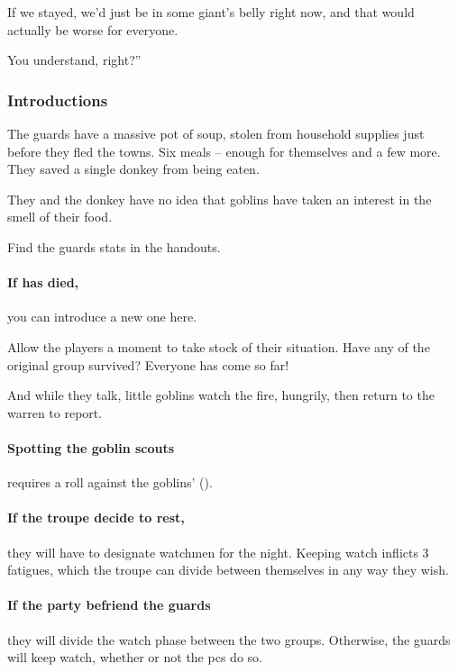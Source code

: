\begin{multicols}{2}
\begin{speechtext}
  If we stayed, we'd just be in some giant's belly right now, and that would actually be worse for everyone.

  You understand, right?''
\end{speechtext}

\subsubsection{Introductions}

The \glspl{guard} have a massive pot of soup, stolen from household supplies just before they fled the towns.
Six meals -- enough for themselves and a few more.
They saved a single donkey from being eaten.


They and the donkey have no idea that goblins have taken an interest in the smell of their food.

Find the \glspl{guard} stats in the handouts.

\paragraph{If  has died,}
you can introduce a new one here.

Allow the players a moment to take stock of their situation.
Have any of the original group survived?
Everyone has come so far!

And while they talk, little goblins watch the fire, hungrily, then return to the warren to report.


\paragraph{Spotting the goblin scouts}
requires a  roll against the goblins'  (\tn).

\paragraph{If the troupe decide to rest,}
they will have to designate watchmen for the night.
Keeping watch inflicts 3 \glspl{fatigue}, which the troupe can divide between themselves in any way they wish.

\paragraph{If the party befriend the \glspl{guard}}
they will divide the watch phase between the two groups.
Otherwise, the \glspl{guard} will keep watch, whether or not the \glspl{pc} do so.


\end{multicols}
